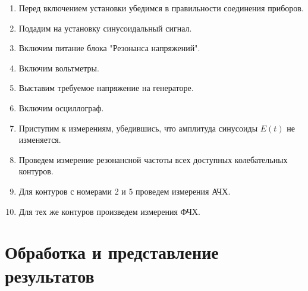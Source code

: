 \documentclass[14pt, a4paper]{report}
\begin{document}
\begin{enumerate}

\setcounter{enumi}{0}

\item Перед включением установки убедимся в правильности соединения приборов.

\item Подадим на установку синусоидальный сигнал.

\item Включим питание блока "Резонанса напряжений".

\item Включим вольтметры.

\item Выставим требуемое напряжение на генераторе.

\item Включим осциллограф.

\item Приступим к измерениям, убедившись, что амплитуда синусоиды $E(t)$ не изменяется.

\item Проведем измерение резонансной частоты всех доступных колебательных контуров.

\item Для контуров с номерами 2 и 5 проведем измерения АЧХ.

\item Для тех же контуров произведем измерения ФЧХ.

\end{enumerate}

\section{Обработка и представление результатов}
\end{document}
